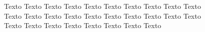 \begin{figure}[ht!]
\centering

\caption{\textmd{Texto Texto Texto Texto Texto Texto Texto Texto Texto Texto Texto Texto Texto Texto Texto Texto Texto Texto Texto Texto Texto Texto Texto Texto Texto Texto Texto Texto}}
\label{fig:figuraex}

\end{figure}
